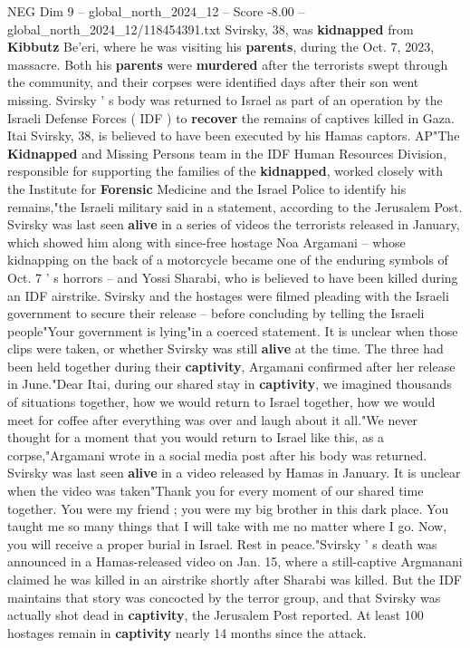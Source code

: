 \begin{textsample}{NEG Dim 9 – global\_north\_2024\_12 – Score -8.00 – global\_north\_2024\_12/118454391.txt}  \label{ex:f9_neg_119}
Svirsky, 38, was \textbf{kidnapped} from \textbf{Kibbutz} Be'eri, where he was visiting his \textbf{parents}, during the Oct. 7, 2023, massacre.
Both his \textbf{parents} were \textbf{murdered} after the terrorists swept through the community, and their corpses were identified days after their son went missing.
Svirsky ' s body was returned to Israel as part of an operation by the Israeli Defense Forces ( IDF ) to \textbf{recover} the remains of captives killed in Gaza.
Itai Svirsky, 38, is believed to have been executed by his Hamas captors.
AP"The \textbf{Kidnapped} and Missing Persons team in the IDF Human Resources Division, responsible for supporting the families of the \textbf{kidnapped}, worked closely with the Institute for \textbf{Forensic} Medicine and the Israel Police to identify his remains,"the Israeli military said in a statement, according to the Jerusalem Post.
Svirsky was last seen \textbf{alive} in a series of videos the terrorists released in January, which showed him along with since-free hostage Noa Argamani -- whose kidnapping on the back of a motorcycle became one of the enduring symbols of Oct. 7 ' s horrors -- and Yossi Sharabi, who is believed to have been killed during an IDF airstrike.
Svirsky and the hostages were filmed pleading with the Israeli government to secure their release -- before concluding by telling the Israeli people"Your government is lying"in a coerced statement.
It is unclear when those clips were taken, or whether Svirsky was still \textbf{alive} at the time.
The three had been held together during their \textbf{captivity}, Argamani confirmed after her release in June."Dear Itai, during our shared stay in \textbf{captivity}, we imagined thousands of situations together, how we would return to Israel together, how we would meet for coffee after everything was over and laugh about it all."We never thought for a moment that you would return to Israel like this, as a corpse,"Argamani wrote in a social media post after his body was returned.
Svirsky was last seen \textbf{alive} in a video released by Hamas in January.
It is unclear when the video was taken"Thank you for every moment of our shared time together.
You were my friend ; you were my big brother in this dark place.
You taught me so many things that I will take with me no matter where I go.
Now, you will receive a proper burial in Israel.
Rest in peace."Svirsky ' s death was announced in a Hamas-released video on Jan. 15, where a still-captive Argmanani claimed he was killed in an airstrike shortly after Sharabi was killed.
But the IDF maintains that story was concocted by the terror group, and that Svirsky was actually shot dead in \textbf{captivity}, the Jerusalem Post reported.
At least 100 hostages remain in \textbf{captivity} nearly 14 months since the attack.

\end{textsample}
